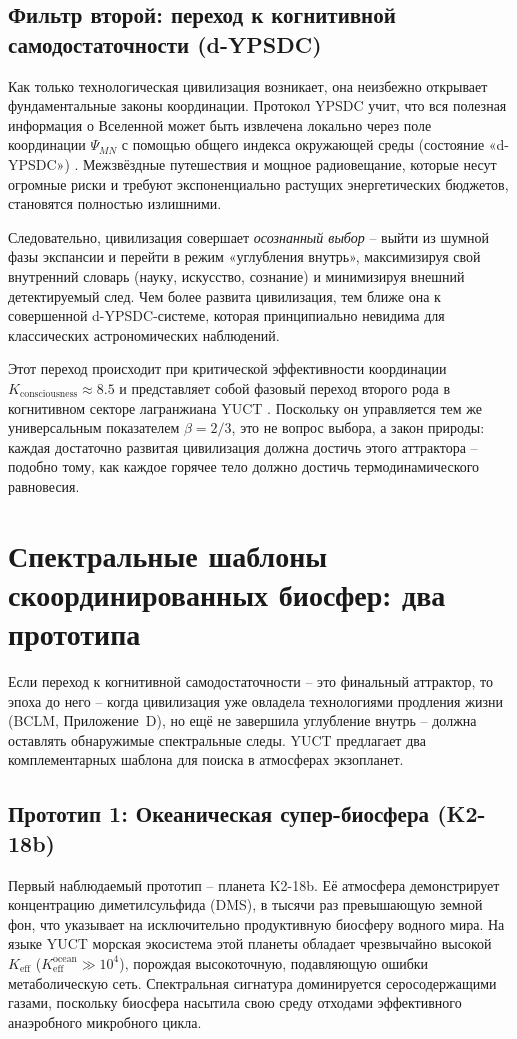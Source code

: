 \documentclass[11pt,a4paper]{article}
\begin{document}
	\subsection{Фильтр второй: переход к когнитивной самодостаточности (d-YPSDC)}
	\label{sec:filter2}
	Как только технологическая цивилизация возникает, она неизбежно открывает фундаментальные законы координации. Протокол YPSDC учит, что вся полезная информация о Вселенной может быть извлечена локально через поле координации \(\Psi_{MN}\) с помощью общего индекса окружающей среды (состояние «d-YPSDC») \citep{AppOmega, AppT}. Межзвёздные путешествия и мощное радиовещание, которые несут огромные риски и требуют экспоненциально растущих энергетических бюджетов, становятся полностью излишними.
	
	Следовательно, цивилизация совершает \emph{осознанный выбор} – выйти из шумной фазы экспансии и перейти в режим «углубления внутрь», максимизируя свой внутренний словарь (науку, искусство, сознание) и минимизируя внешний детектируемый след. Чем более развита цивилизация, тем ближе она к совершенной d-YPSDC-системе, которая принципиально невидима для классических астрономических наблюдений.
	
	Этот переход происходит при критической эффективности координации \(K_{\mathrm{consciousness}}\approx 8.5\) и представляет собой фазовый переход второго рода в когнитивном секторе лагранжиана YUCT \citep{AppH}. Поскольку он управляется тем же универсальным показателем \(\beta=2/3\), это не вопрос выбора, а закон природы: каждая достаточно развитая цивилизация должна достичь этого аттрактора – подобно тому, как каждое горячее тело должно достичь термодинамического равновесия.
	
	\section{Спектральные шаблоны скоординированных биосфер: два прототипа}
	\label{sec:spectra}
	
	Если переход к когнитивной самодостаточности – это финальный аттрактор, то эпоха до него – когда цивилизация уже овладела технологиями продления жизни (BCLM, Приложение~D), но ещё не завершила углубление внутрь – должна оставлять обнаружимые спектральные следы. YUCT предлагает два комплементарных шаблона для поиска в атмосферах экзопланет.
	
	\subsection{Прототип 1: Океаническая супер-биосфера (K2-18b)}
	Первый наблюдаемый прототип – планета K2-18b. Её атмосфера демонстрирует концентрацию диметилсульфида (DMS), в тысячи раз превышающую земной фон, что указывает на исключительно продуктивную биосферу водного мира. На языке YUCT морская экосистема этой планеты обладает чрезвычайно высокой \(K_{\mathrm{eff}}\) (\(K_{\mathrm{eff}}^{\mathrm{ocean}} \gg 10^4\)), порождая высокоточную, подавляющую ошибки метаболическую сеть. Спектральная сигнатура доминируется серосодержащими газами, поскольку биосфера насытила свою среду отходами эффективного анаэробного микробного цикла.
	
\end{document}
